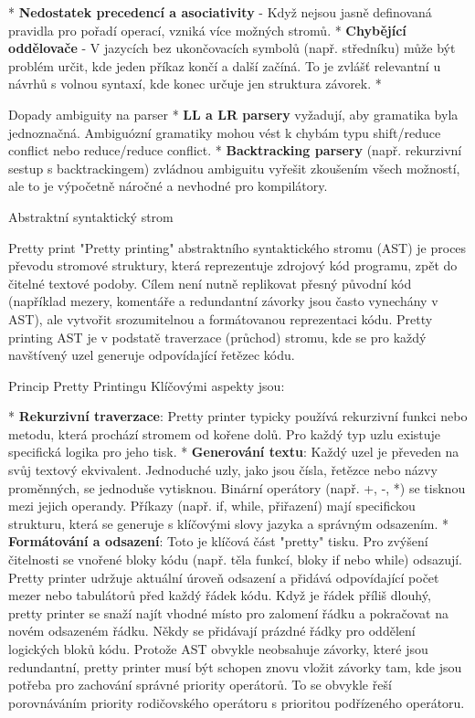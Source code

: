 * {\bf Nedostatek precedencí a asociativity} - Když nejsou jasně definovaná pravidla pro pořadí operací, vzniká více možných stromů.
* {\bf Chybějící oddělovače} - V jazycích bez ukončovacích symbolů (např. středníku) může být problém určit, kde jeden příkaz končí a další začíná. To je zvlášť relevantní u návrhů s volnou syntaxí, kde konec určuje jen struktura závorek.
* {\bf 
\enditems

\secc Dopady ambiguity na parser
\begitems
* {\bf LL a LR parsery} vyžadují, aby gramatika byla jednoznačná. Ambiguózní gramatiky mohou vést k chybám typu shift/reduce conflict nebo reduce/reduce conflict.
* {\bf Backtracking parsery} (např. rekurzivní sestup s backtrackingem) zvládnou ambiguitu vyřešit zkoušením všech možností, ale to je výpočetně náročné a nevhodné pro kompilátory.
\enditems

\sec Abstraktní syntaktický strom

\sec Pretty print
"Pretty printing" abstraktního syntaktického stromu (AST) je proces převodu stromové struktury, která reprezentuje zdrojový kód programu, zpět do čitelné textové podoby. Cílem není nutně replikovat přesný původní kód (například mezery, komentáře a redundantní závorky jsou často vynechány v AST), ale vytvořit srozumitelnou a formátovanou reprezentaci kódu. Pretty printing AST je v podstatě traverzace (průchod) stromu, kde se pro každý navštívený uzel generuje odpovídající řetězec kódu. 

\secc Princip Pretty Printingu
Klíčovými aspekty jsou:

\begitems
* {\bf Rekurzivní traverzace}: Pretty printer typicky používá rekurzivní funkci nebo metodu, která prochází stromem od kořene dolů. Pro každý typ uzlu existuje specifická logika pro jeho tisk.
* {\bf Generování textu}: Každý uzel je převeden na svůj textový ekvivalent. Jednoduché uzly, jako jsou čísla, řetězce nebo názvy proměnných, se jednoduše vytisknou. Binární operátory (např. +, -, *) se tisknou mezi jejich operandy. Příkazy (např. if, while, přiřazení) mají specifickou strukturu, která se generuje s klíčovými slovy jazyka a správným odsazením.
* {\bf Formátování a odsazení}: Toto je klíčová část "pretty" tisku. Pro zvýšení čitelnosti se vnořené bloky kódu (např. těla funkcí, bloky if nebo while) odsazují. Pretty printer udržuje aktuální úroveň odsazení a přidává odpovídající počet mezer nebo tabulátorů před každý řádek kódu. Když je řádek příliš dlouhý, pretty printer se snaží najít vhodné místo pro zalomení řádku a pokračovat na novém odsazeném řádku. Někdy se přidávají prázdné řádky pro oddělení logických bloků kódu. Protože AST obvykle neobsahuje závorky, které jsou redundantní, pretty printer musí být schopen znovu vložit závorky tam, kde jsou potřeba pro zachování správné priority operátorů. To se obvykle řeší porovnáváním priority rodičovského operátoru s prioritou podřízeného operátoru.
\enditems

}
